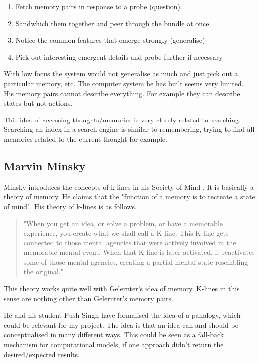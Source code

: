 \begin{enumerate}
  \item Fetch memory pairs in response to a probe (question)
  \item Sandwhich them together and peer through the bundle at once
  \item Notice the common features that emerge strongly (generalise)
  \item Pick out interesting emergent details and probe further if necessary
\end{enumerate}

With low focus the system would not generalise as much and just pick out a particular memory, etc. The computer system he has built seems very limited. His memory pairs cannot describe everything. For example they can describe states but not actions.

This idea of accessing thoughts/memories is very closely related to searching. Searching an index in a search engine is similar to remembering, trying to find all memories related to the current thought for example.

\subsection{Marvin Minsky}

Minsky introduces the concepts of k-lines in his Society of Mind \citep{Minsky1980, Minsky1988}. It is basically a theory of memory. He claims that the "function of a memory is to recreate a state of mind". His theory of k-lines is as follows.

\begin{quote}
  "When you get an idea, or solve a problem, or have a memorable experience, you create what we shall call a K-line. This K-line gets connected to those mental agencies that were actively involved in the memorable mental event. When that K-line is later activated, it reactivates some of those mental agencies, creating a partial mental state resembling the original."\citep{Minsky1980, Minsky1988}
\end{quote}

This theory works quite well with Gelernter's idea of memory. K-lines in this sense are nothing other than Gelernter's memory pairs.

He and his student Push Singh have formalised the idea of a panalogy, which could be relevant for my project. The idea is that an idea can and should be conceptualised in many different ways. This could be seen as a fall-back mechanism for computational models, if one approach didn't return the desired/expected results.

